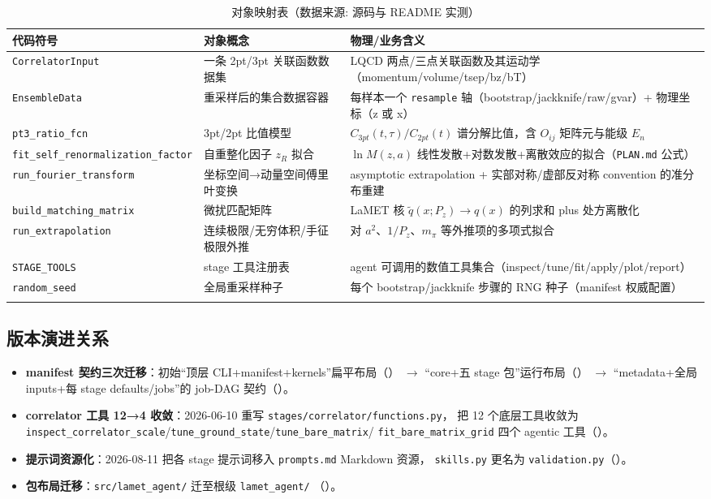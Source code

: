 \documentclass[UTF8]{ctexart}
\begin{document}
\begin{xltabular}{\textwidth}{lXX}
\toprule
\textcolor{relation}{代码符号} & \textcolor{relation}{对象概念} & 物理/业务含义 \\
\midrule
\endhead
\texttt{CorrelatorInput} & 一条 2pt/3pt 关联函数数据集 & LQCD 两点/三点关联函数及其运动学（momentum/volume/tsep/bz/bT）\\
\texttt{EnsembleData} & 重采样后的集合数据容器 & 每样本一个 \texttt{resample} 轴（bootstrap/jackknife/raw/gvar）+ 物理坐标（z 或 x）\\
\texttt{pt3\_ratio\_fcn} & 3pt/2pt 比值模型 & $C_{3pt}(t,\tau)/C_{2pt}(t)$ 谱分解比值，含 $O_{ij}$ 矩阵元与能级 $E_n$\\
\texttt{\nolinkurl{fit_self_renormalization_factor}} & 自重整化因子 $z_R$ 拟合 & $\ln M(z,a)$ 线性发散+对数发散+离散效应的拟合（\texttt{PLAN.md} 公式）\\
\texttt{run\_fourier\_transform} & 坐标空间→动量空间傅里叶变换 & asymptotic extrapolation + 实部对称/虚部反对称 convention 的准分布重建\\
\texttt{build\_matching\_matrix} & 微扰匹配矩阵 & LaMET 核 $\tilde{q}(x;P_z)\to q(x)$ 的列求和 plus 处方离散化\\
\texttt{run\_extrapolation} & 连续极限/无穷体积/手征极限外推 & 对 $a^2$、$1/P_z$、$m_\pi$ 等外推项的多项式拟合\\
\texttt{STAGE\_TOOLS} & stage 工具注册表 & agent 可调用的数值工具集合（inspect/tune/fit/apply/plot/report）\\
\texttt{random\_seed} & 全局重采样种子 & 每个 bootstrap/jackknife 步骤的 RNG 种子（manifest 权威配置）\\
\bottomrule
\caption{对象映射表（数据来源: 源码与 README 实测）}
\end{xltabular}

\subsection{版本演进关系}

\begin{itemize}
\item \textbf{manifest 契约三次迁移}：初始“顶层 CLI+manifest+kernels”扁平布局（\texttt{}）
$\to$ “core+五 stage 包”运行布局（\texttt{}）
$\to$ “metadata+全局 inputs+每 stage defaults/jobs”的 job-DAG 契约（\texttt{}）。
\item \textbf{correlator 工具 12→4 收敛}：2026-06-10 重写 \texttt{stages/correlator/functions.py}，
把 12 个底层工具收敛为 \texttt{inspect\_correlator\_scale}/\texttt{tune\_ground\_state}/\texttt{tune\_bare\_matrix}/
\texttt{fit\_bare\_matrix\_grid} 四个 agentic 工具（\texttt{}）。
\item \textbf{提示词资源化}：2026-08-11 把各 stage 提示词移入 \texttt{prompts.md} Markdown 资源，
\texttt{skills.py} 更名为 \texttt{validation.py}（\texttt{}）。
\item \textbf{包布局迁移}：\texttt{src/lamet\_agent/} 迁至根级 \texttt{lamet\_agent/}
（\texttt{}）。
\end{itemize}
\end{document}
